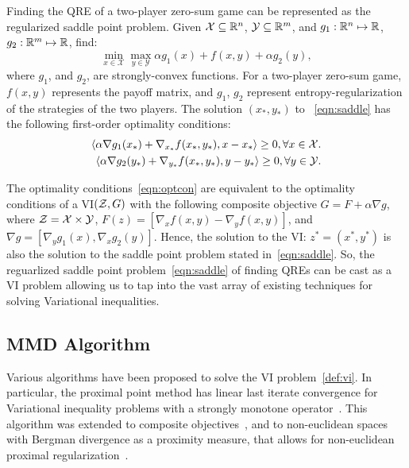 Finding the QRE of a two-player zero-sum game can be represented as the regularized saddle point
problem.
Given $\mathcal{X} \subseteq \mathbb{R}^n$, $\mathcal{Y} \subseteq \mathbb{R}^m$, and $g_1: \mathbb{R}^n \mapsto \mathbb{R}$, $g_2: \mathbb{R}^m
	\mapsto \mathbb{R}$, find:
\begin{equation}
	\label{eqn:saddle} \min_{x \in \mathcal{X}} \max_{y \in
		\mathcal{Y}} \alpha g_1(x) + f(x, y) + \alpha g_2(y),
\end{equation} where $g_1$, and $g_2$, are
strongly-convex functions.
For a two-player zero-sum game, $f(x, y)$ represents the payoff matrix, and $g_1$, $g_2$ represent
entropy-regularization of the strategies of the two players.
The solution $(x_{\ast}, y_{\ast})$ to~ \ref{eqn:saddle} has the following first-order optimality
conditions:
\begin{equation}
	\label{eqn:optcon}
	\begin{split}
		\langle \alpha \nabla g_1(x_*) +
		\nabla_{x_*} f(x_*, y_*), x - x_* \rangle \geq 0, \forall x \in \mathcal{X}.
		\\
		\langle \alpha \nabla g_2(y_*) +
		\nabla_{y_*} f(x_*, y_*),
		y - y_* \rangle \geq 0, \forall y \in \mathcal{Y}.
	\end{split}
\end{equation}

The optimality conditions~\ref{eqn:optcon} are equivalent to the optimality conditions of a
VI$(\mathcal{Z}, G)$ with the following composite objective $G = F + \alpha \nabla g$, where $\mathcal{Z} =
	\mathcal{X} \times \mathcal{Y}$, $F(z) = [\nabla_x f(x,y) - \nabla_y f(x,y)]$, and $\nabla g =
	[\nabla_y g_1(x), \nabla_x g_2(y)]$.
Hence, the solution to the VI: $z^* = (x^*, y^*)$ is also the solution to the saddle point problem
stated in~\ref{eqn:saddle}.
So, the reguarlized saddle point problem~\ref{eqn:saddle} of finding QREs can be cast as a VI
problem allowing us to tap into the vast array of existing techniques for solving Variational
inequalities.

\subsection{MMD Algorithm}
Various algorithms have been proposed to solve the VI problem~\ref{def:vi}.
In particular, the proximal point method has linear last iterate convergence for Variational
inequality problems with a strongly monotone operator~\cite{rockafellarMonotone1976}.
This algorithm was extended to composite objectives~\cite{tsenglinear1995}, and to non-euclidean
spaces with Bergman divergence as a proximity measure, that allows for non-euclidean proximal
regularization~\cite{tsengApproximation2010}.


